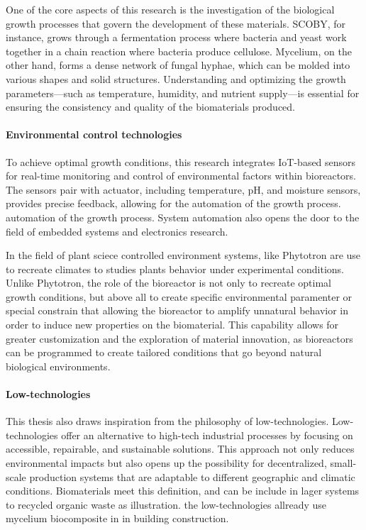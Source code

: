 One of the core aspects of this research is the investigation of the biological growth processes that govern the development of these materials. SCOBY, for instance, grows through a fermentation process where bacteria and yeast work together in a chain reaction where bacteria produce cellulose. Mycelium, on the other hand, forms a dense network of fungal hyphae, which can be molded into various shapes and solid structures. Understanding and optimizing the growth parameters—such as temperature, humidity, and nutrient supply—is essential for ensuring the consistency and quality of the biomaterials produced.

\paragraph[short]{Environmental
control technologies}
To achieve optimal growth conditions, this research integrates IoT-based sensors for real-time monitoring and control of environmental factors within bioreactors. 
The sensors pair with actuator, including temperature, pH, and moisture sensors, provides precise feedback, allowing for the automation of the growth process. 
automation of the growth process. System automation also opens the door to the field of embedded systems and electronics research. 

In the field of plant sciece controlled environment systems, like Phytotron are use to recreate climates to studies plants behavior under experimental conditions.
Unlike Phytotron, the role of the bioreactor is not only to recreate optimal growth conditions, but above all to create specific environmental paramenter or special constrain that allowing the bioreactor to amplify unnatural behavior in order to induce new properties on the biomaterial.  This capability allows for greater customization and the exploration of material innovation, as bioreactors can be programmed to create tailored conditions that go beyond natural biological environments.
 

\paragraph[short]{Low-technologies} 
This thesis also draws inspiration from the philosophy of low-technologies.
Low-technologies offer an alternative to high-tech industrial processes by focusing on accessible, repairable, and sustainable solutions. 
This approach not only reduces environmental impacts but also opens up the possibility for decentralized, small-scale production systems that are adaptable to different geographic and climatic conditions. 
Biomaterials meet this definition, and can be include in lager systems to recycled organic waste as illustration. the low-technologies allready use mycelium biocomposite in in building construction. 

